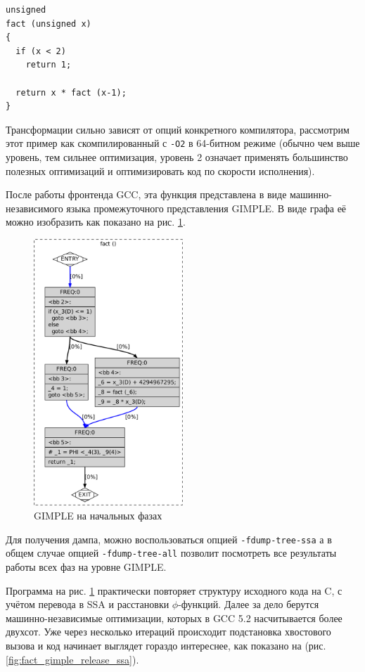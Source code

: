 \documentclass[a4paper,12pt,oneside]{article}
\begin{document}
\begin{lstlisting}
unsigned
fact (unsigned x)
{
  if (x < 2)
    return 1;

  return x * fact (x-1);
}
\end{lstlisting}

Трансформации сильно зависят от опций конкретного компилятора, рассмотрим этот пример как скомпилированный с \lstinline!-O2! в 64-битном режиме (обычно чем выше уровень, тем сильнее оптимизация, уровень 2 означает применять большинство полезных оптимизаций и оптимизировать код по скорости исполнения).

После работы фронтенда GCC, эта функция представлена в виде машинно-независимого языка промежуточного представления GIMPLE. В виде графа её можно изобразить как показано на рис. \ref{fig:fact_gimple_ssa}.

\begin{figure}[ht]
\centering
\includegraphics[width=0.5\textwidth]{illustrations/fact-ssa-crop.pdf}
\caption{GIMPLE на начальных фазах}
\label{fig:fact_gimple_ssa}
\end{figure}

Для получения дампа, можно воспользоваться опцией \lstinline!-fdump-tree-ssa! а в общем случае опцией \lstinline!-fdump-tree-all! позволит посмотреть все результаты работы всех фаз на уровне GIMPLE.

Программа на рис. \ref{fig:fact_gimple_ssa} практически повторяет структуру исходного кода на C, с учётом перевода в SSA и расстановки $\phi$-функций. Далее за дело берутся машинно-независимые оптимизации, которых в GCC 5.2 насчитывается более двухсот. Уже через несколько итераций происходит подстановка хвостового вызова и код начинает выглядет гораздо интереснее, как показано на (рис. \ref{fig:fact_gimple_release_ssa}).
\end{document}
